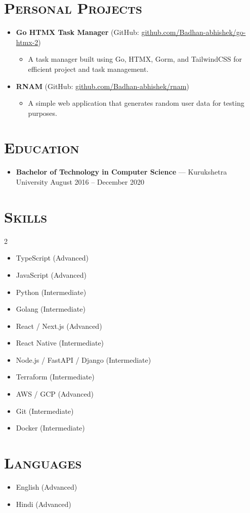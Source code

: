 \documentclass[a4paper,10pt]{article}
\newcommand{\resumesection}[1]{\section*{\scshape{#1}}}
\newcommand{\resumeitem}[2]{\item \textbf{#1} --- #2}
\begin{document}
\resumesection{Personal Projects}
\begin{itemize}[leftmargin=0.5cm]
   \item \textbf{Go HTMX Task Manager} (GitHub: \href{https://github.com/Badhan-abhishek/go-htmx-2}{github.com/Badhan-abhishek/go-htmx-2})
   \begin{itemize}
      \item A task manager built using Go, HTMX, Gorm, and TailwindCSS for efficient project and task management.
   \end{itemize}
   \item \textbf{RNAM} (GitHub: \href{https://github.com/Badhan-abhishek/rnam}{github.com/Badhan-abhishek/rnam})
   \begin{itemize}
      \item A simple web application that generates random user data for testing purposes.
   \end{itemize}
\end{itemize}

\resumesection{Education}
\begin{itemize}[leftmargin=0.5cm]
  \resumeitem{Bachelor of Technology in Computer Science}{Kurukshetra University \hfill August 2016 -- December 2020}
\end{itemize}

\resumesection{Skills}
\begin{multicols}{2}
\begin{itemize}[leftmargin=0.5cm, label={}]
  \item TypeScript (Advanced)
  \item JavaScript (Advanced)
  \item Python (Intermediate)
  \item Golang (Intermediate)
  \item React / Next.js (Advanced)
  \item React Native (Intermediate)
  \item Node.js / FastAPI / Django (Intermediate)
  \item Terraform (Intermediate)
  \item AWS / GCP (Advanced)
  \item Git (Intermediate)
  \item Docker (Intermediate)
\end{itemize}
\end{multicols}

\resumesection{Languages}
\begin{itemize}[leftmargin=0.5cm]
  \item English (Advanced)
  \item Hindi (Advanced)
\end{itemize}
\end{document}
